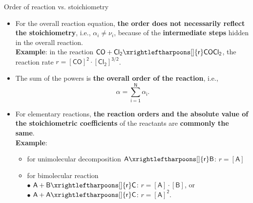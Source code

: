 \begin{frame}[shrink]{Order of reaction vs. stoichiometry}
	\begin{itemize}
	\item For the overall reaction equation, \alert{\bf the order does not necessarily reflect the stoichiometry}, i.e., 
	$\alpha_i \neq \nu_i$,
	because of the {\bf intermediate steps} hidden in the overall reaction.\\[5pt]
	{\bf Example}: in the reaction $\mathsf{CO + Cl_2 \xrightleftharpoons[]{r} COCl_2}$, the reaction rate $r = \mathsf{[CO]^2 \cdot [Cl_2]^{3/2}}$.
	\pause
	\item The sum of the powers is \alert{\bf the overall order of the reaction}, i.e., 
	\[\mathsf{\alpha = \sum_{i=1}^{N} \alpha_i}.\]
	\pause
	\item For elementary reactions, {\bf the reaction orders and the absolute value of the stoichiometric
coefficients} of the reactants are \alert{\bf commonly the same}. \\[5pt]
%
    {\bf Example}:
	\begin{itemize}
	\item for unimolecular decomposition $\mathsf{A \xrightleftharpoons[]{r} B}$: $r = \mathsf{[A]}$
	\item for bimolecular reaction \\[5pt]
 	$\bullet$ $\mathsf{A + B \xrightleftharpoons[]{r} C}$: $r = \mathsf{[A] \cdot [B]}$, or \\
	$\bullet$ $\mathsf{A + A \xrightleftharpoons[]{r} C}$: $r = \mathsf{[A]^2}$.
	\end{itemize}
\end{itemize}
\end{frame}
%
%
